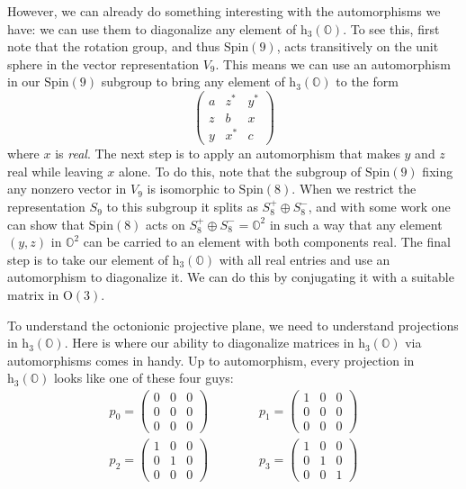 \documentclass{article}
\begin{document}
However, we can already do something interesting with the automorphisms
we have: we can use them to diagonalize any element of
\(\mathrm{h}_3(\mathbb{O})\). To see this, first note that the rotation
group, and thus \(\mathrm{Spin}(9)\), acts transitively on the unit
sphere in the vector representation \(V_9\). This means we can use an
automorphism in our \(\mathrm{Spin}(9)\) subgroup to bring any element
of \(\mathrm{h}_3(\mathbb{O})\) to the form \[
  \left(
    \begin{array}{ccc}
      a&z^*&y^*
    \\z&b&x
    \\y&x^*&c
    \end{array}
  \right)
\] where \(x\) is \emph{real}. The next step is to apply an automorphism
that makes \(y\) and \(z\) real while leaving \(x\) alone. To do this,
note that the subgroup of \(\mathrm{Spin}(9)\) fixing any nonzero vector
in \(V_9\) is isomorphic to \(\mathrm{Spin}(8)\). When we restrict the
representation \(S_9\) to this subgroup it splits as
\(S_8^+\oplus S_8^-\), and with some work one can show that
\(\mathrm{Spin}(8)\) acts on \(S_8^+\oplus S_8^- = \mathbb{O}^2\) in
such a way that any element \((y,z)\) in \(\mathbb{O}^2\) can be carried
to an element with both components real. The final step is to take our
element of \(\mathrm{h}_3(\mathbb{O})\) with all real entries and use an
automorphism to diagonalize it. We can do this by conjugating it with a
suitable matrix in \(\mathrm{O}(3)\).

To understand the octonionic projective plane, we need to understand
projections in \(\mathrm{h}_3(\mathbb{O})\). Here is where our ability
to diagonalize matrices in \(\mathrm{h}_3(\mathbb{O})\) via
automorphisms comes in handy. Up to automorphism, every projection in
\(\mathrm{h}_3(\mathbb{O})\) looks like one of these four guys: \[
  \begin{gathered}
    p_0 =
    \left(
      \begin{array}{ccc}
        0&0&0\\0&0&0\\0&0&0
      \end{array}
    \right)
    \qquad\qquad
    p_1 =
    \left(
      \begin{array}{ccc}
        1&0&0\\0&0&0\\0&0&0
      \end{array}
    \right)
  \\p_2 =
    \left(
      \begin{array}{ccc}
        1&0&0\\0&1&0\\0&0&0
      \end{array}
    \right)
    \qquad\qquad
    p_3 =
    \left(
      \begin{array}{ccc}
        1&0&0\\0&1&0\\0&0&1
      \end{array}
    \right)
  \end{gathered}
\]
\end{document}
